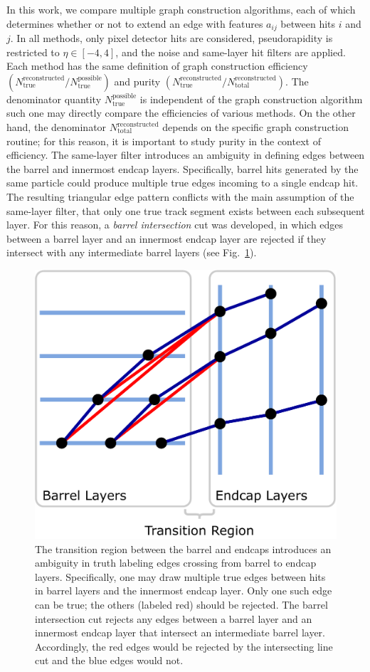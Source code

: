 \documentclass[twocolumn]{svjour3}
\begin{document}
In this work, we compare multiple graph construction algorithms, each of which determines whether or not to extend an edge with features $a_{ij}$ between hits $i$ and $j$. 
In all methods, only pixel detector hits are considered, pseudorapidity is restricted to $\eta\in[-4,4]$, and 
the noise and same-layer hit filters are applied. 
Each method has the same definition of graph construction efficiency $(N_{\mathrm{true}}^{\mathrm{reconstructed}}/N_{\mathrm{true}}^{\mathrm{possible}})$ and purity $(N_{\mathrm{true}}^{\mathrm{reconstructed}}/N_{\mathrm{total}}^{\mathrm{reconstructed}})$.
The denominator quantity $N_{\mathrm{true}}^{\mathrm{possible}}$ is independent of the graph construction algorithm such one may directly compare the efficiencies of various methods.
On the other hand, the denominator $N_{\mathrm{total}}^{\mathrm{reconstructed}}$ depends on the specific graph construction routine; for this reason, it is important to study purity in the context of efficiency.
The same-layer filter introduces an ambiguity in defining edges between the barrel and innermost endcap layers. 
Specifically, barrel hits generated by the same particle could produce multiple true edges incoming to a single endcap hit. 
The resulting triangular edge pattern conflicts with the main assumption of the same-layer filter, that only one true track segment exists between each subsequent layer. 
For this reason, a \textit{barrel intersection} cut was developed, in which edges between a barrel layer and an innermost endcap layer are rejected if they intersect with any intermediate barrel layers (see Fig.~\ref{fig:intersecting_line_cut}). 

\begin{figure}[!htbp]
\centering
\includegraphics[width=0.7\columnwidth]{intersecting_line_cut.pdf}
\caption{The transition region between the barrel and endcaps introduces an ambiguity in truth labeling edges crossing from barrel to endcap layers. 
Specifically, one may draw multiple true edges between hits in barrel layers and the innermost endcap layer. 
Only one such edge can be true; the others (labeled red) should be rejected. 
The barrel intersection cut rejects any edges between a barrel layer and an innermost endcap layer that intersect an intermediate barrel layer. 
Accordingly, the red edges would be rejected by the intersecting line cut and the blue edges would not.}
\label{fig:intersecting_line_cut} 
\end{figure}
\end{document}
